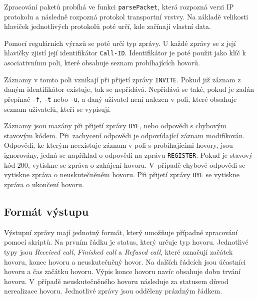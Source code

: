 \documentclass[11pt,a4paper]{article}
\begin{document}
Zpracování paketů probíhá ve funkci \texttt{parsePacket}, která rozpozná verzi
IP protokolu a následně rozpozná protokol transportní vrstvy. Na základě velikosti
hlaviček jednotlivých protokolů poté určí, kde začínají vlastní data.

Pomocí regulárních výrazů se poté určí typ zprávy. U každé zprávy se z její hlavičky
zjistí její identifikátor \texttt{Call-ID}. Identifikátor je poté použit jako klíč 
k asociativnímu poli, které obsahuje seznam probíhajících hovorů.

Záznamy v tomto poli vznikají při přijetí zprávy \texttt{INVITE}. Pokud již 
záznam z daným identifikátor existuje, tak se nepřidává. Nepřidává se také, pokud
je zadán přepínač \texttt{-f}, \texttt{-t} nebo \texttt{-u}, a daný uživatel není nalezen v poli, které obsahuje
seznam uživatelů, kteří se vypisují.

Záznamy jsou mazány při přijetí zprávy \texttt{BYE}, nebo odpovědi s chybovým stavovým kódem.
Při~zachycení odpovědi je odpovídající záznam modifikován. Odpovědi, ke kterým neexistuje záznam v poli s probíhajícími hovory, jsou
ignorovány, jedná se například o odpovědi na zprávu \texttt{REGISTER}. Pokud je stavový kód 200,
vytiskne se zpráva o zahájení hovoru. V~případě chybové odpovědi se vytiskne zpráva o neuskutečněném hovoru.
Při přijetí zprávy \texttt{BYE} se vytiskne zpráva o ukončení hovoru.

\subsection{Formát výstupu}
Výstupní zprávy mají jednotný formát, který umožňuje případné zpracování pomocí skriptů.
Na prvním řádku je status, který určuje typ hovoru. Jednotlivé typy jsou \emph{Received call},
\emph{Finished call} a \emph{Refused call}, které označují začátek hovoru, konec hovoru a neuskutečněný
hovor. Na dalších řádcích jsou účastníci hovoru a čas začátku hovoru. Výpis konce hovoru navíc
obsahuje dobu trvání hovoru. V~případě neuskutečněného hovoru následuje za statusem důvod nerealizace hovoru.
Jednotlivé zprávy jsou odděleny prázdným řádkem.
\end{document}
